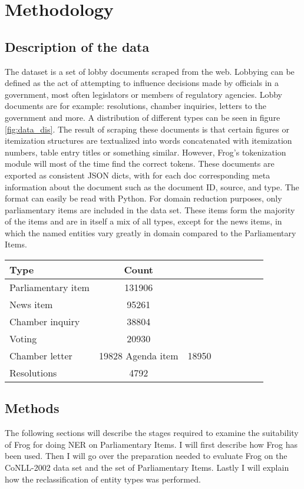 \section{Methodology}
\label{sec:meth}


\subsection{Description of the data}
The dataset is a set of lobby documents scraped from the web. Lobbying can be defined as the act of attempting to influence decisions made by officials in a government, most often legislators or members of regulatory agencies. Lobby documents are for example: resolutions, chamber inquiries, letters to the government and more. A distribution of different types can be seen in figure \ref{fig:data_dis}. The result of scraping these documents is that certain figures or itemization structures are textualized into words concatenated with itemization numbers, table entry titles or something similar. However, Frog's tokenization module will most of the time find the correct tokens.  These documents are exported as consistent JSON dicts, with for each doc corresponding meta information about the document such as the document ID, source, and type. The format can easily be read with Python. For domain reduction purposes, only parliamentary items are included in the data set. These items form the majority of the items and are in itself a mix of all types, except for the news items, in which the named entities vary greatly in domain compared to the Parliamentary Items.

\begin{tabular}{l*{6}{c}r}\label{fig:data-dis}
Type              & Count \\
\hline
Parliamentary item & 131906  \\
News item & 95261 \\
Chamber inquiry & 38804  \\
Voting & 20930 \\
Chamber letter & 19828
Agenda item & 18950  \\
Resolutions & 4792 \\
\end{tabular}

\subsection{Methods}
The following sections will describe the stages required to examine the suitability of Frog for doing NER on Parliamentary Items. I will first describe how Frog has been used. Then I will go over the preparation needed to evaluate Frog on the CoNLL-2002 data set and the set of Parliamentary Items. Lastly I will explain how the reclassification of entity types was performed. 

